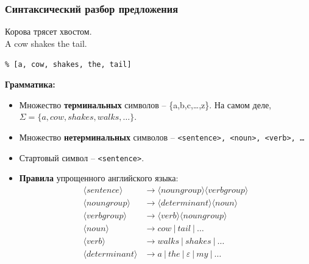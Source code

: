 \documentclass[10pt]{beamer}
\begin{document}
\begin{frame}[fragile]
  \frametitle{Синтаксический разбор предложения}
  Корова трясет хвостом.\\
  A cow shakes the tail.

  \verb|% [a, cow, shakes, the, tail]|

  \textbf{Грамматика:}
  \begin{itemize}
  \item Множество \textbf{терминальных} символов -- \{a,b,c,\ldots,z\}.  На самом деле, $\Sigma=\{a,cow,shakes,walks,\ldots\}$.
  \item Множество \textbf{нетерминальных} символов -- \texttt{<sentence>, <noun>, <verb>, \ldots}
  \item \textnormal{Стартовый} символ -- \texttt{<sentence>}.
  \item \textbf{Правила} упрощенного английского языка:
    \begin{align}
      \label{eq:eng-gramm}
      \langle{}sentence\rangle{} & \to  \langle{}noun group\rangle{} \langle{}verb group\rangle{} \\
      \langle{}noun group\rangle{} & \to  \langle{}determinant\rangle{} \langle{}noun\rangle{} \\
      \langle{}verb group\rangle{} & \to  \langle{}verb\rangle{} \langle{}noun group\rangle{} \\
      \langle{}noun\rangle{} & \to cow\ |\ tail\ |\ \ldots \\
      \langle{}verb\rangle{} & \to walks\ |\ shakes\ |\ \ldots \\
      \langle{}determinant\rangle{} & \to a\ |\ the\ |\ \varepsilon\ |\ my\ |\ \ldots
    \end{align}
  \end{itemize}
\end{frame}
\end{document}
